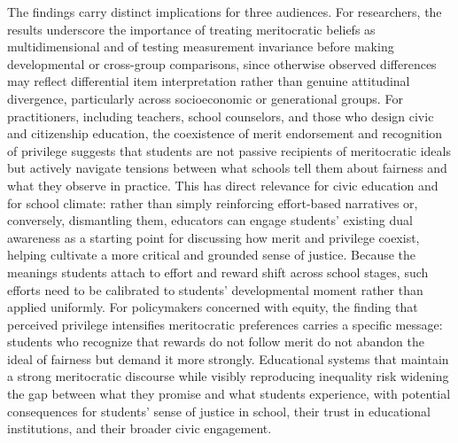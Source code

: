 \documentclass[
  13pt,
]{article}
\begin{document}
The findings carry distinct implications for three audiences. For
researchers, the results underscore the importance of treating
meritocratic beliefs as multidimensional and of testing measurement
invariance before making developmental or cross-group comparisons, since
otherwise observed differences may reflect differential item
interpretation rather than genuine attitudinal divergence, particularly
across socioeconomic or generational groups. For practitioners,
including teachers, school counselors, and those who design civic and
citizenship education, the coexistence of merit endorsement and
recognition of privilege suggests that students are not passive
recipients of meritocratic ideals but actively navigate tensions between
what schools tell them about fairness and what they observe in practice.
This has direct relevance for civic education and for school climate:
rather than simply reinforcing effort-based narratives or, conversely,
dismantling them, educators can engage students' existing dual awareness
as a starting point for discussing how merit and privilege coexist,
helping cultivate a more critical and grounded sense of justice. Because
the meanings students attach to effort and reward shift across school
stages, such efforts need to be calibrated to students' developmental
moment rather than applied uniformly. For policymakers concerned with
equity, the finding that perceived privilege intensifies meritocratic
preferences carries a specific message: students who recognize that
rewards do not follow merit do not abandon the ideal of fairness but
demand it more strongly. Educational systems that maintain a strong
meritocratic discourse while visibly reproducing inequality risk
widening the gap between what they promise and what students experience,
with potential consequences for students' sense of justice in school,
their trust in educational institutions, and their broader civic
engagement.
\end{document}
